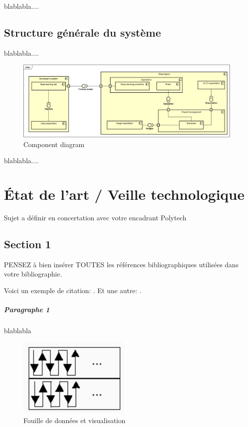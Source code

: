 \documentclass{polytech/polytech}
\numberwithin{figure}{chapter}
\begin{document}
blablabla....

\section{Structure générale du système}

blablabla....

\begin{figure}[ht] 
    \centering 
    \includegraphics[width=\textwidth]{pic/20221116DiagComponent.png} 
    \caption{Component diagram}
    \label{diagComp}
\end{figure}

blablabla....

\chapter{État de l'art / Veille technologique}

Sujet a définir en concertation avec votre encadrant Polytech

\section{Section 1}

PENSEZ à bien insérer TOUTES les références bibliographiques
utilisées dans votre bibliographie.

Voici un exemple de citation: \cite{DBLP:journals/corr/abs-1804-02767}.
Et une autre: \linebreak \cite{DBLP:journals/corr/RedmonDGF15}.

\paragraph{Paragraphe 1}

blablabla

\begin{figure}[ht] 
    \centering 
    \includegraphics[width=0.5\textwidth]{pic/barre.png} 
    \caption{Fouille de données et visualisation} 
    \label{fdv} 
\end{figure}
\end{document}
